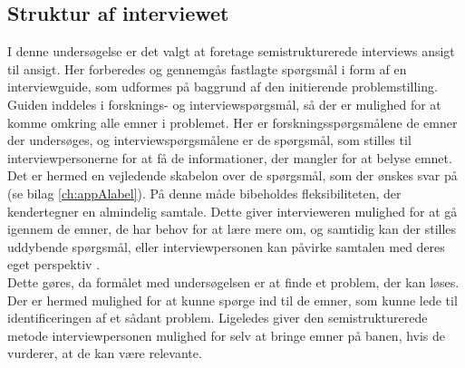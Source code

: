 \subsection {Struktur af interviewet}
I denne undersøgelse er det valgt at foretage semistrukturerede interviews ansigt til ansigt. Her forberedes og gennemgås fastlagte spørgsmål i form af en interviewguide, som udformes på baggrund af den initierende problemstilling. Guiden inddeles i forsknings- og interviewspørgsmål, så der er mulighed for at komme omkring alle emner i problemet. Her er forskningsspørgsmålene de emner der undersøges, og interviewspørgsmålene er de spørgsmål, som stilles til interviewpersonerne for at få de informationer, der mangler for at belyse emnet. Det er hermed en vejledende skabelon over de spørgsmål, som der ønskes svar på (se bilag \ref{ch:appAlabel}). På denne måde bibeholdes fleksibiliteten, der kendertegner en almindelig samtale. Dette giver intervieweren mulighed for at gå igennem de emner, de har behov for at lære mere om, og samtidig kan der stilles uddybende spørgsmål, eller interviewpersonen kan påvirke samtalen med deres eget perspektiv \citep{brinkmann2014}\citep{kvale2015}.\\
Dette gøres, da formålet med undersøgelsen er at finde et problem, der kan løses. Der er hermed mulighed for at kunne spørge ind til de emner, som kunne lede til identificeringen af et sådant problem. Ligeledes giver den semistrukturerede metode interviewpersonen mulighed for selv at bringe emner på banen, hvis de vurderer, at de kan være relevante.

